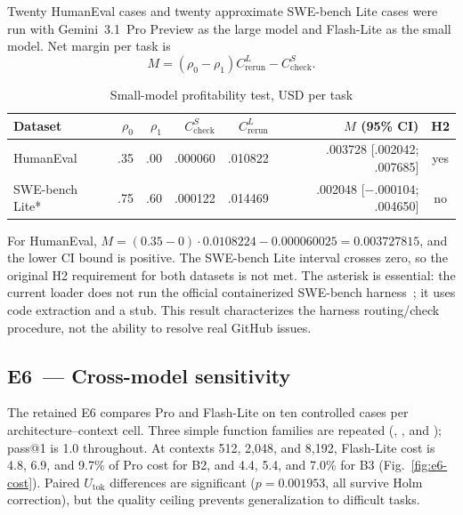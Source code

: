 Twenty HumanEval cases and twenty approximate SWE-bench Lite cases were run with Gemini~3.1~Pro Preview as the large model and Flash-Lite as the small model. Net margin per task is
\begin{equation}
M=(\rho_0-\rho_1)C_{\mathrm{rerun}}^L-C_{\mathrm{check}}^S.
\label{eq:e4-margin}
\end{equation}

\begin{table}[htbp]
\caption{Small-model profitability test, USD per task}
\label{tab:e4-results}
\centering
\begin{tabular}{@{}lrrrrrc@{}}
\toprule
Dataset & $\rho_0$ & $\rho_1$ & $C_{\mathrm{check}}^S$ & $C_{\mathrm{rerun}}^L$ & $M$ (95\% CI) & H2 \\
\midrule
HumanEval & .35 & .00 & .000060 & .010822 & .003728 [.002042; .007685] & yes \\
SWE-bench Lite* & .75 & .60 & .000122 & .014469 & .002048 [$-.000104$; .004650] & no \\
\bottomrule
\end{tabular}
\end{table}

For HumanEval, $M=(0.35-0)\cdot0.0108224-0.000060025=0.003727815$, and the lower CI bound is positive. The SWE-bench Lite interval crosses zero, so the original H2 requirement for both datasets is not met. The asterisk is essential: the current loader does not run the official containerized SWE-bench harness~\cite{jimenez2023swebench}; it uses code extraction and a  stub. This result characterizes the harness routing/check procedure, not the ability to resolve real GitHub issues.

\subsection{E6~--- Cross-model sensitivity}\label{subsec:e6}

The retained E6 compares Pro and Flash-Lite on ten controlled cases per architecture--context cell. Three simple function families are repeated (, , and ); pass@1 is 1.0 throughout. At contexts 512, 2,048, and 8,192, Flash-Lite cost is 4.8, 6.9, and 9.7\% of Pro cost for B2, and 4.4, 5.4, and 7.0\% for B3 (Fig.~\ref{fig:e6-cost}). Paired $U_{\mathrm{tok}}$ differences are significant ($p=0.001953$, all survive Holm correction), but the quality ceiling prevents generalization to difficult tasks.

